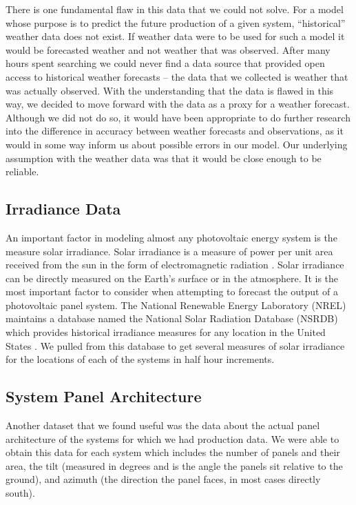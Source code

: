 \documentclass[11pt, fullpage,letterpaper]{article}
\begin{document}
There is one fundamental flaw in this data that we could not solve. For a model whose purpose is to predict the future production of a given system, “historical” weather data does not exist. If weather data were to be used for such a model it would be forecasted weather and not weather that was observed. After many hours spent searching we could never find a data source that provided open access to historical weather forecasts – the data that we collected is weather that was actually observed. With the understanding that the data is flawed in this way, we decided to move forward with the data as a proxy for a weather forecast. Although we did not do so, it would have been appropriate to do further research into the difference in accuracy between weather forecasts and observations, as it would in some way inform us about possible errors in our model. Our underlying assumption with the weather data was that it would be close enough to be reliable. 

\FloatBarrier

\subsection{Irradiance Data}

An important factor in modeling almost any photovoltaic energy system is the measure solar irradiance. Solar irradiance is a measure of power per unit area received  from the sun in the form of electromagnetic radiation \cite{nasa}. Solar irradiance can be directly measured on the Earth’s surface or in the atmosphere. It is the most important factor to consider when attempting to forecast the output of a photovoltaic panel system. The National Renewable Energy Laboratory (NREL) maintains a database named the National Solar Radiation Database (NSRDB) which provides historical irradiance measures for any location in the United States \cite{nsrdb}. We pulled from this database to get several measures of solar irradiance for the locations of each of the systems in half hour increments. 

\subsection{System Panel Architecture}

Another dataset that we found useful was the data about the actual panel architecture of the systems for which we had production data. We were able to obtain this data for each system which includes the number of panels and their area, the tilt (measured in degrees and is the angle the panels sit relative to the ground), and azimuth (the direction the panel faces, in most cases directly south). 
\end{document}
